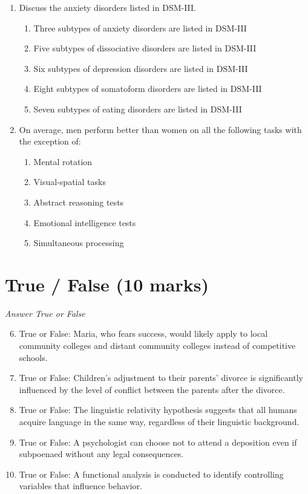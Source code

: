 \documentclass[12pt]{article}
\begin{document}
\begin{enumerate}[label=\arabic*.]
\begin{enumerate}[label=(\alph*)]
\end{enumerate}
\item Discuss the anxiety disorders listed in DSM-III.
\begin{enumerate}[label=(\alph*)]
    \item Three subtypes of anxiety disorders are listed in DSM-III
    \item Five subtypes of dissociative disorders are listed in DSM-III
    \item Six subtypes of depression disorders are listed in DSM-III
    \item Eight subtypes of somatoform disorders are listed in DSM-III
    \item Seven subtypes of eating disorders are listed in DSM-III
\end{enumerate}
\item On average, men perform better than women on all the following tasks with the exception of:
\begin{enumerate}[label=(\alph*)]
    \item Mental rotation
    \item Visual-spatial tasks
    \item Abstract reasoning tests
    \item Emotional intelligence tests
    \item Simultaneous processing
\end{enumerate}
\end{enumerate}

\section*{True / False (10 marks)}
\textit{Answer True or False}
\begin{enumerate}[label=\arabic*.]
\setcounter{enumi}{5}
\item True or False: Maria, who fears success, would likely apply to local community colleges and distant community colleges instead of competitive schools.
\item True or False: Children's adjustment to their parents' divorce is significantly influenced by the level of conflict between the parents after the divorce.
\item True or False: The linguistic relativity hypothesis suggests that all humans acquire language in the same way, regardless of their linguistic background.
\item True or False: A psychologist can choose not to attend a deposition even if subpoenaed without any legal consequences.
\item True or False: A functional analysis is conducted to identify controlling variables that influence behavior.
\end{enumerate}
\end{document}
